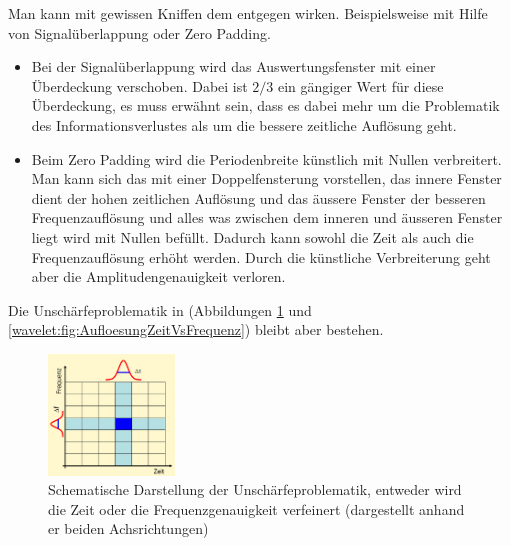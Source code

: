 Man kann mit gewissen Kniffen dem entgegen wirken. Beispielsweise mit Hilfe von Signalüberlappung oder Zero Padding.
\begin{itemize}
	\item Bei der Signalüberlappung wird das Auswertungsfenster mit einer Überdeckung verschoben. Dabei ist $2/3$ ein gängiger Wert für diese Überdeckung, es muss erwähnt sein, dass es dabei mehr um die Problematik des Informationsverlustes als um die bessere zeitliche Auflösung geht.
	\item Beim Zero Padding wird die Periodenbreite künstlich mit Nullen verbreitert. Man kann sich das mit einer Doppelfensterung vorstellen, das innere Fenster dient der hohen zeitlichen Auflösung und das äussere Fenster der besseren Frequenzauflösung und alles was zwischen dem inneren und äusseren Fenster liegt wird mit Nullen befüllt. Dadurch kann sowohl die Zeit als auch die Frequenzauflösung erhöht werden. Durch die künstliche Verbreiterung geht aber die Amplitudengenauigkeit verloren.
\end{itemize}
Die Unschärfeproblematik in (Abbildungen \ref{wavelet:fig:FFTAufloesung} und \ref{wavelet:fig:AufloesungZeitVsFrequenz}) bleibt aber bestehen.

\begin{figure}
	\centering
	\includegraphics[width=0.3\textwidth]{papers/wavelets/images/6-1_FFTAufloesung.png}
	\caption{Schematische Darstellung der Unschärfeproblematik, entweder wird die Zeit oder die Frequenzgenauigkeit verfeinert (dargestellt anhand er beiden Achsrichtungen)}
	\label{wavelet:fig:FFTAufloesung}
\end{figure}

